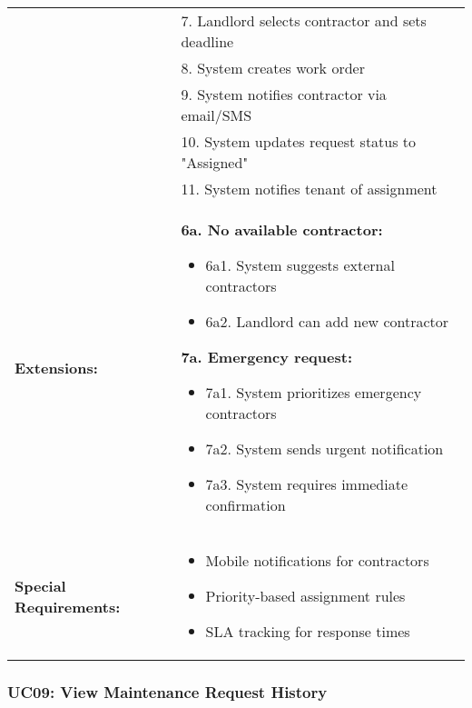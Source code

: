 \documentclass[12pt]{article}
\begin{document}
\begin{longtable}{|p{3cm}|p{11cm}|}
& 7. Landlord selects contractor and sets deadline \\
& 8. System creates work order \\
& 9. System notifies contractor via email/SMS \\
& 10. System updates request status to "Assigned" \\
& 11. System notifies tenant of assignment \\
\hline
\textbf{Extensions:} & 
\textbf{6a. No available contractor:}
\begin{itemize}
    \item 6a1. System suggests external contractors
    \item 6a2. Landlord can add new contractor
\end{itemize}
\textbf{7a. Emergency request:}
\begin{itemize}
    \item 7a1. System prioritizes emergency contractors
    \item 7a2. System sends urgent notification
    \item 7a3. System requires immediate confirmation
\end{itemize} \\
\hline
\textbf{Special Requirements:} & 
\begin{itemize}
    \item Mobile notifications for contractors
    \item Priority-based assignment rules
    \item SLA tracking for response times
\end{itemize} \\
\hline
\end{longtable}

\subsubsection{UC09: View Maintenance Request History}
\end{document}
